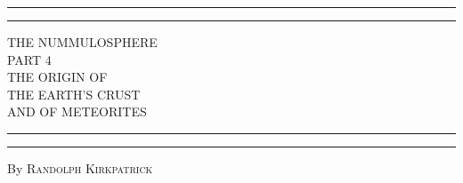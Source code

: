 \documentclass[a4paper, 12pt, oneside]{article}
\begin{document}
\begin{titlepage} %
	\centering %
	\scshape %

	
	\rule{\textwidth}{1.6pt}\vspace*{-\baselineskip}\vspace*{2pt} %
	\rule{\textwidth}{0.4pt} %
	
	\vspace{0.75\baselineskip} %
	
	{\LARGE THE NUMMULOSPHERE\\ PART 4\\ THE ORIGIN OF \\THE EARTH'S CRUST\\ AND OF METEORITES\\} %
	
	\vspace{0.75\baselineskip} %
	
	\rule{\textwidth}{0.4pt}\vspace*{-\baselineskip}\vspace{3.2pt} %
	\rule{\textwidth}{1.6pt} %
	
	\vspace{1\baselineskip} %
	
	
	{By \scshape\Large Randolph Kirkpatrick\\} %
	
	\vspace*{1\baselineskip} %
	
	
	\vspace{1\baselineskip} %

	

\end{titlepage}
\end{document}
